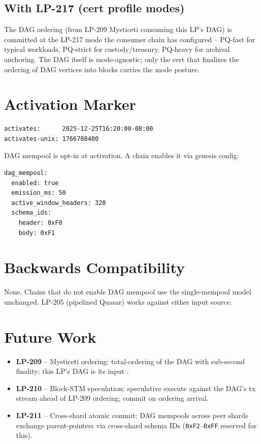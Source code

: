 \subsection{With LP-217 (cert profile modes)}

The DAG ordering (from LP-209 Mysticeti consuming this LP's DAG) is
committed at the LP-217 mode the consumer chain has configured --
PQ-fast for typical workloads, PQ-strict for custody/treasury,
PQ-heavy for archival anchoring. The DAG itself is mode-agnostic;
only the cert that finalizes the ordering of DAG vertices into
blocks carries the mode posture.

\section{Activation Marker}

\begin{verbatim}
activates:      2025-12-25T16:20:00-08:00
activates-unix: 1766708400
\end{verbatim}

DAG mempool is opt-in at activation. A chain enables it via genesis
config:

\begin{verbatim}
dag_mempool:
  enabled: true
  emission_ms: 50
  active_window_headers: 320
  schema_ids:
    header: 0xF0
    body: 0xF1
\end{verbatim}

\section{Backwards Compatibility}

None. Chains that do not enable DAG mempool use the single-mempool
model unchanged. LP-205 (pipelined Quasar) works against either
input source.

\section{Future Work}

\begin{itemize}[leftmargin=2em,nosep]
\item \textbf{LP-209} -- Mysticeti ordering: total-ordering of the
  DAG with sub-second finality; this LP's DAG is its input
  \cite{mysticeti2024}.
\item \textbf{LP-210} -- Block-STM speculation: speculative execute
  against the DAG's tx stream ahead of LP-209 ordering; commit on
  ordering arrival.
\item \textbf{LP-211} -- Cross-shard atomic commit: DAG mempools
  across peer shards exchange parent-pointers via cross-shard schema
  IDs (\texttt{0xF2}--\texttt{0xFF} reserved for this).
\end{itemize}

